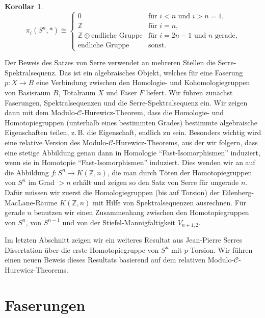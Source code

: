 \documentclass[11pt, a4paper, german]{article}
\theoremstyle{definition}
\newtheorem{kor}[lem]{Korollar}
\theoremstyle{remark}
\newcommand{\R}{\mathbb{R}} %
\newcommand{\Z}{\mathbb{Z}} %
\newcommand{\SC}{\mathcal{C}} %
\newcommand{\V}[2]{V_{{#2},{#1}}} %
\newcommand{\zB}{z.\,B.}
\begin{document}
\begin{kor}\mbox{}
  \vspace{-1.4em}
  \[
    \pi_i(S^n, *) \cong \begin{cases}
      0 & \text{für $i < n$ und $i > n = 1$,} \\
      \Z & \text{für $i = n$,} \\
      \Z \oplus \text{endliche Gruppe} & \text{für $i=2n-1$ und $n$ gerade,} \\
      \text{endliche Gruppe} & \text{sonst.}
    \end{cases}
  \]
\end{kor}

Der Beweis des Satzes von Serre verwendet an mehreren Stellen die Serre-Spektralsequenz.
Das ist ein algebraisches Objekt, welches für eine Faserung $p : X \to B$ eine Verbindung zwischen den Homologie- und Kohomologiegruppen von Basisraum $B$, Totalraum $X$ und Faser $F$ liefert.
Wir führen zunächst Faserungen, Spektralsequenzen und die Serre-Spektralsequenz ein.
Wir zeigen dann mit dem Modulo-$\SC$-Hurewicz-Theorem, dass die Homologie- und Homotopiegruppen (unterhalb eines bestimmten Grades) bestimmte algebraische Eigenschaften teilen, \zB{} die Eigenschaft, endlich zu sein.
Besonders wichtig wird eine relative Version des Modulo-$\SC$-Hurewicz-Theorems, aus der wir folgern, dass eine stetige Abbildung genau dann in Homologie "`Fast-Isomorphismen"' induziert, wenn sie in Homotopie "`Fast-Isomorphismen"' induziert.
Dies wenden wir an auf die Abbildung $f : S^n \to K(\Z, n)$, die man durch Töten der Homotopiegruppen von $S^n$ im Grad $> n$ erhält und zeigen so den Satz von Serre für ungerade $n$.
Dafür müssen wir zuerst die Homologiegruppen (bis auf Torsion) der Eilenberg-MacLane-Räume $K(\Z, n)$ mit Hilfe von Spektralsequenzen ausrechnen.
Für gerade $n$ benutzen wir einen Zusammenhang zwischen den Homotopiegruppen von $S^n$, von $S^{n-1}$ und von der Stiefel-Mannigfaltigkeit $\V{2}{n+1}$.

Im letzten Abschnitt zeigen wir ein weiteres Resultat aus Jean-Pierre Serres Dissertation über die erste Homotopiegruppe von $S^n$ mit $p$-Torsion.
Wir führen einen neuen Beweis dieses Resultats basierend auf dem relativen Modulo-$\SC$-Hurewicz-Theorems.

\section{Faserungen}
\end{document}
